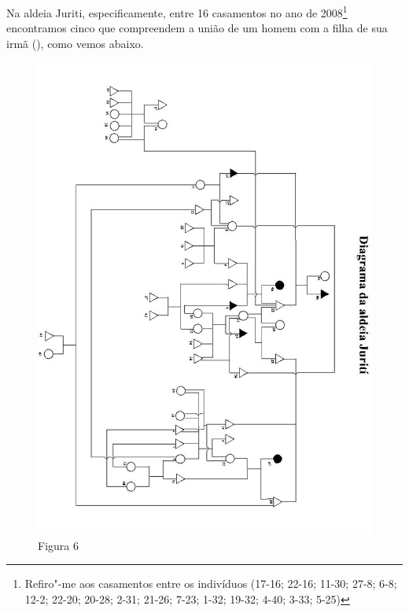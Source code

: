 Na aldeia Juriti, especificamente, entre 16 casamentos no ano de
2008\footnote{Refiro"-me aos casamentos entre os indivíduos (17-16;
  22-16; 11-30; 27-8; 6-8; 12-2; 22-20; 20-28; 2-31; 21-26; 7-23; 1-32;
  19-32; 4-40; 3-33; 5-25)} encontramos cinco que compreendem a união de
um homem com a filha de sua irmã (), como vemos abaixo.



\begin{figure}
\centering
  \includegraphics[width=170mm]{./imgs/Figura_6b}
\caption{Figura 6}
\end{figure}



